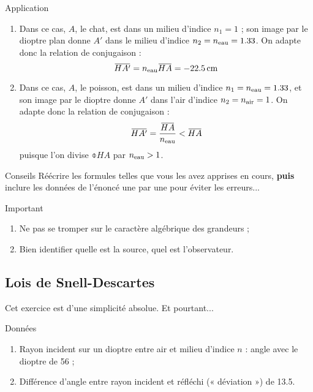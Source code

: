 \documentclass[10pt,a5paper,notitlepage]{book}
\begin{document}
\begin{lgtcb}{Application}
    \begin{enumerate}
        \item Dans ce cas, $A$, le chat, est dans un milieu d'indice $n_1 = 1$ ;
            son image par le dioptre plan donne $A'$ dans le milieu d'indice
            $n_2 = n _{\text{eau}} = 1.33$. On adapte donc la relation de conjugaison
            :
        \[ \obar{HA'} = n \St{eau}\obar{HA} = \SI{-22.5}{cm}\]
        \item Dans ce cas, $A$, le poisson, est dans un milieu d'indice $n_1 = n
            _{\text{eau}} = 1.33$, et son image par le dioptre donne $A'$ dans l'air
            d'indice $n_2 = n _{\text{air}} = 1$. On adapte donc la relation de
            conjugaison :
            \[ \obar{HA'} = \frac{\obar{HA}}{n \St{eau}} < \obar{HA} \]
            puisque l'on divise $\obar{HA}$ par $n _{\text{eau}} > 1$.
    \end{enumerate}
\end{lgtcb}

\begin{ptcb}{Conseils}
    Réécrire les formules telles que vous les avez apprises en cours,
    \textbf{puis} inclure les données de l'énoncé une par une pour éviter les
    erreurs...
\end{ptcb}

\begin{bvtcb}{Important}
    \begin{enumerate}
        \item Ne pas se tromper sur le caractère {\huge algébrique} des
            grandeurs ;
        \item Bien identifier quelle est la source, quel est l'observateur.
    \end{enumerate}
\end{bvtcb}

\subsection{Lois de Snell-Descartes}
Cet exercice est d'une simplicité absolue. Et pourtant...
\begin{vtcb}{Données}
    \begin{enumerate}
        \item Rayon incident sur un dioptre entre air et milieu d'indice $n$ :
            angle {\huge avec le dioptre} de \SI{56}{\degres} ;
        \item Différence d'angle entre rayon incident et réfléchi (« déviation
            ») de \SI{13.5}{\degres}.
    \end{enumerate}
\end{vtcb}
\end{document}
